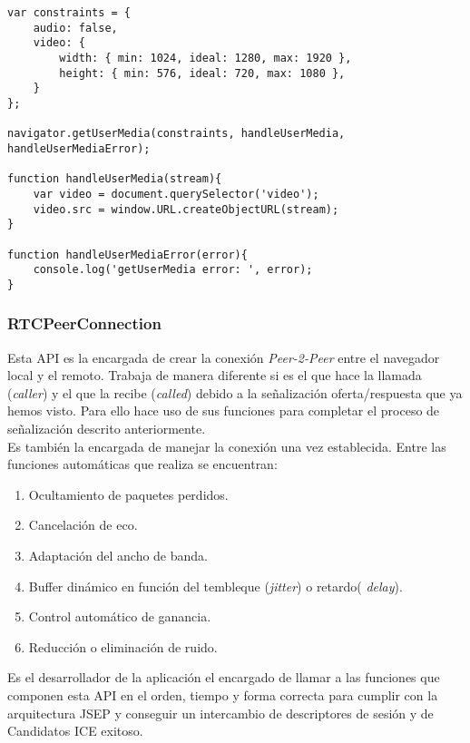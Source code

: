 \begin{lstlisting}[caption=Llamada a función RTCPeerConnection]
var constraints = {
    audio: false,
    video: {
        width: { min: 1024, ideal: 1280, max: 1920 },
        height: { min: 576, ideal: 720, max: 1080 },
    }
};

navigator.getUserMedia(constraints, handleUserMedia, handleUserMediaError); 

function handleUserMedia(stream){
    var video = document.querySelector('video');
    video.src = window.URL.createObjectURL(stream);
}

function handleUserMediaError(error){
	console.log('getUserMedia error: ', error);
}

\end{lstlisting}

\subsubsection{RTCPeerConnection}

Esta API es la encargada de crear la conexión \emph{Peer-2-Peer} entre el navegador local y el remoto. Trabaja de manera diferente si es el que hace la llamada (\textit{caller}) y el que la recibe (\textit{called}) debido a la señalización oferta/respuesta que ya hemos visto. Para ello hace uso de sus funciones para completar el proceso de señalización descrito anteriormente.\\

\noindent Es también la encargada de manejar la conexión una vez establecida. Entre las funciones automáticas que realiza se encuentran:\\

\begin{enumerate}
\item Ocultamiento de paquetes perdidos.
\item Cancelación de eco.
\item Adaptación del ancho de banda.
\item Buffer dinámico en función del tembleque (\emph{jitter}) o retardo( \emph{delay}).
\item Control automático de ganancia.
\item Reducción o eliminación de ruido.
\end{enumerate}

Es el desarrollador de la aplicación el encargado de llamar a las funciones que componen esta API en el orden, tiempo y forma correcta para cumplir con la arquitectura JSEP y conseguir un intercambio de descriptores de sesión y de Candidatos ICE exitoso.\\

